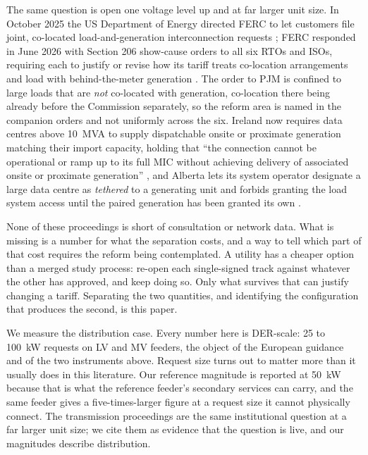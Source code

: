 \documentclass[review,authoryear,12pt]{elsarticle}
\begin{document}
The same question is open one voltage level up and at far larger unit size. In
October 2025 the US Department of Energy directed FERC to let customers file
joint, co-located load-and-generation interconnection requests
\citep{doe_anopr2025}; FERC responded in June 2026 with Section 206 show-cause
orders to all six RTOs and ISOs, requiring each to justify or revise how its
tariff treats co-location arrangements and load with behind-the-meter
generation \citep{ferc206_2026}. The order to PJM is confined to large loads
that are \emph{not} co-located with generation, co-location there being already
before the Commission separately, so the reform area is named in the companion
orders and not uniformly across the six. Ireland now
requires data centres above 10~MVA to supply dispatchable onsite or proximate
generation matching their import capacity, holding that ``the connection cannot
be operational or ramp up to its full MIC without achieving delivery of
associated onsite or proximate generation'' \citep{cru2025}, and Alberta lets
its system operator designate a large data centre as \emph{tethered} to a
generating unit and forbids granting the load system access until the paired
generation has been granted its own \citep{alberta_dcr2026}.

None of these proceedings is short of consultation or network data. What is
missing is a number for what the separation costs, and a way to tell which part
of that cost requires the reform being contemplated. A utility has a cheaper
option than a merged study process: re-open each single-signed track against
whatever the other has approved, and keep doing so. Only what survives that can
justify changing a tariff. Separating the two quantities, and identifying the
configuration that produces the second, is this paper.

We measure the distribution case. Every number here is DER-scale: 25 to
100~kW requests on LV and MV feeders, the object of the European guidance and
of the two instruments above. Request size turns out to matter more than it
usually does in this literature. Our reference magnitude is reported at 50~kW
because that is what the reference feeder's secondary services can carry, and
the same feeder gives a five-times-larger figure at a request size it cannot
physically connect. The transmission proceedings are the same institutional
question at a far larger unit size; we cite them as evidence that the question
is live, and our magnitudes describe distribution.
\end{document}
